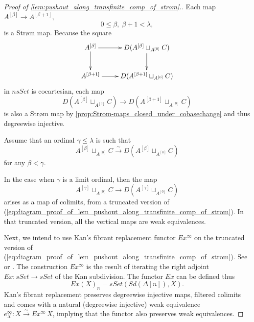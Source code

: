 \begin{proof}[Proof of \cref{lem:pushout_along_transfinite_comp_of_strom}.]
Each map $A^{[\beta ]}\to A^{[\beta +1]}$,
\[0\leq \beta ,\; \beta +1<\lambda,\]
is a Str\o m map. Because the square
\begin{displaymath}
\xymatrix{
A^{[\beta ]} \ar[d] \ar[r] & D(A^{[\beta ]}\sqcup _{A^{[0]}}C) \ar[d] \\
A^{[\beta +1]} \ar[r] & D(A^{[\beta +1]}\sqcup _{A^{[0]}}C)
}
\end{displaymath}
in $nsSet$ is cocartesian, each map
\[D(A^{[\beta ]}\sqcup _{A^{[0]}}C)\to D(A^{[\beta +1]}\sqcup _{A^{[0]}}C)\]
is also a Str\o m map by \cref{prop:Strom-maps_closed_under_cobasechange} and thus degreewise injective.

Assume that an ordinal $\gamma \leq \lambda$ is such that
\[A^{[\beta ]}\sqcup _{A^{[0]}}C\xrightarrow{\sim } D(A^{[\beta ]}\sqcup _{A^{[0]}}C)\]
for any $\beta <\gamma$.

In the case when $\gamma$ is a limit ordinal, then the map
\[A^{[\gamma ]}\sqcup _{A^{[0]}}C\to D(A^{[\gamma ]}\sqcup _{A^{[0]}}C)\]
arises as a map of colimits, from a truncated version of (\ref{eq:diagram_proof_of_lem_pushout_along_transfinite_comp_of_strom}). In that truncated version, all the vertical maps are weak equivalences.

Next, we intend to use Kan's fibrant replacement functor $Ex^\infty$ on the truncated version of (\ref{eq:diagram_proof_of_lem_pushout_along_transfinite_comp_of_strom}). See \cite[pp.~215--217]{FP90} or \cite[p.~182--188]{GJ09}. The construction $Ex^\infty$ is the result of iterating the right adjoint $Ex:sSet\to sSet$ of the Kan subdivision. The functor $Ex$ can be defined thus
\[Ex(X)_n=sSet(Sd(\Delta [n]),X).\]
Kan's fibrant replacement preserves degreewise injective maps, filtered colimits and comes with a natural (degreewise injective) weak equivalence $e^\infty _X:X\xrightarrow{\sim } Ex^\infty\, X$, implying that the functor also preserves weak equivalences.




\end{proof}

